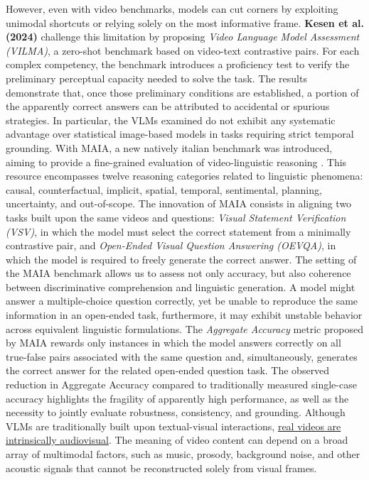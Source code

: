 However, even with video benchmarks, models can cut corners by exploiting unimodal shortcuts or relying solely on the most informative frame. \textbf{Kesen et al. (2024)}\cite{kesen2024vilma} challenge this limitation by proposing \textit{Video Language Model Assessment (\acs{VILMA})}, a zero-shot benchmark based on video-text contrastive pairs.
For each complex competency, the benchmark introduces a proficiency test to verify the preliminary perceptual capacity needed to solve the task. The results demonstrate that, once those preliminary conditions are established, a portion of the apparently correct answers can be attributed to accidental or spurious strategies. In particular, the \acsp{VLM} examined do not exhibit any systematic advantage over statistical image-based models in tasks requiring strict temporal grounding.
With \acs{MAIA}, a new natively italian benchmark was introduced, aiming to provide a fine-grained evaluation of video-linguistic reasoning \cite{testa2025maia}. This resource encompasses twelve reasoning categories related to linguistic phenomena: causal, counterfactual, implicit, spatial, temporal, sentimental, planning, uncertainty, and out-of-scope. The innovation of \acs{MAIA} consists in aligning two tasks built upon the same videos and questions: \textit{Visual Statement Verification (\acs{VSV})}, in which the model must select the correct statement from a minimally contrastive pair, and \textit{Open-Ended Visual Question Answering (\acs{OEVQA})}, in which the model is required to freely generate the correct answer.
The setting of the \acs{MAIA} benchmark allows us to assess not only accuracy, but also coherence between discriminative comprehension and linguistic generation. A model might answer a multiple-choice question correctly, yet be unable to reproduce the same information in an open-ended task, furthermore, it may exhibit unstable behavior across equivalent linguistic formulations.
The \textit{Aggregate Accuracy} metric proposed by \acs{MAIA} rewards only instances in which the model answers correctly on all true-false pairs associated with the same question and, simultaneously, generates the correct answer for the related open-ended question task.
The observed reduction in Aggregate Accuracy compared to traditionally measured single-case accuracy highlights the fragility of apparently high performance, as well as the necessity to jointly evaluate robustness, consistency, and grounding.
Although \acsp{VLM} are traditionally built upon textual-visual interactions, \underline{real videos are intrinsically audiovisual}. The meaning of video content can depend on a broad array of multimodal factors, such as music, prosody, background noise, and other acoustic signals that cannot be reconstructed solely from visual frames.

